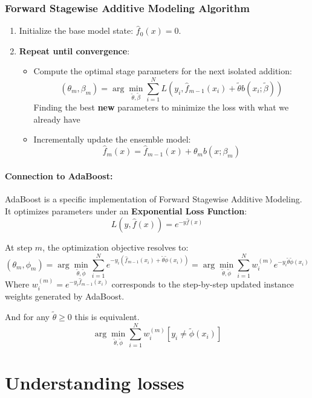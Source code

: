 \documentclass{article}
\begin{document}
\subsubsection{Forward Stagewise Additive Modeling Algorithm}
\begin{enumerate}
  \item Initialize the base model state: $\hat{f}_0(x) = 0$.
  \item \textbf{Repeat until convergence}:
  \begin{itemize}
    \item Compute the optimal stage parameters for the next isolated addition:
    \[ (\theta_m, \beta_m) = \arg\min_{\tilde{\theta},\tilde{\beta}}\sum_{i=1}^N L\left(y_i, \hat{f}_{m-1}(x_i) + \tilde{\theta}b(x_i;\tilde{\beta})\right) \]
    Finding the best \textbf{new} parameters to minimize the loss with what we already have
    
    \item Incrementally update the ensemble model:
    \[ \hat{f}_m(x) = \hat{f}_{m-1}(x) + \theta_m b(x;\beta_m) \]
  \end{itemize}
\end{enumerate}

\paragraph{Connection to AdaBoost:}
AdaBoost is a specific implementation of Forward Stagewise Additive Modeling. It optimizes parameters under an \textbf{Exponential Loss Function}:
\[ L\left(y, \hat{f}(x)\right) = e^{-y\hat{f}(x)} \]

At step $m$, the optimization objective resolves to:
\[ (\theta_m, \phi_m) = \arg\min_{\tilde{\theta},\tilde{\phi}}\sum_{i=1}^N e^{-y_i\left(\hat{f}_{m-1}(x_i) + \tilde{\theta}\tilde{\phi}(x_i)\right)} = \arg\min_{\tilde{\theta},\tilde{\phi}}\sum_{i=1}^N w_i^{(m)} e^{-y_i \tilde{\theta}\tilde{\phi}(x_i)} \]
Where $w_i^{(m)} = e^{-y_i \hat{f}_{m-1}(x_i)}$ corresponds to the step-by-step updated instance weights generated by AdaBoost.


And for any $\tilde{\theta} \geq 0 $ this is equivalent.
\[ \arg\min_{\tilde{\theta},\tilde{\phi}}\sum_{i=1}^N w_i^{(m)} [y_i \neq \tilde{\phi}(x_i)] \]


\section{Understanding losses}
\end{document}

